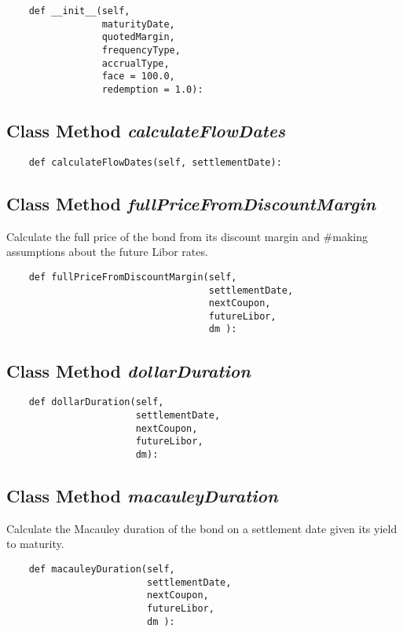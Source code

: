 \documentclass[twoside,11pt]{book}
\begin{document}
\begin{lstlisting}
    def __init__(self, 
                 maturityDate,
                 quotedMargin,
                 frequencyType, 
                 accrualType,
                 face = 100.0, 
                 redemption = 1.0):
\end{lstlisting}

\subsection{Class Method {\it calculateFlowDates}}


\begin{lstlisting}
    def calculateFlowDates(self, settlementDate):
\end{lstlisting}

\subsection{Class Method {\it fullPriceFromDiscountMargin}}
Calculate the full price of the bond from its discount margin and \#making assumptions about the future Libor rates. 

\begin{lstlisting}
    def fullPriceFromDiscountMargin(self, 
                                    settlementDate,
                                    nextCoupon,
                                    futureLibor,
                                    dm ):
\end{lstlisting}

\subsection{Class Method {\it dollarDuration}}


\begin{lstlisting}
    def dollarDuration(self, 
                       settlementDate, 
                       nextCoupon,
                       futureLibor,
                       dm):
\end{lstlisting}

\subsection{Class Method {\it macauleyDuration}}
Calculate the Macauley duration of the bond on a settlement date given its yield to maturity. 

\begin{lstlisting}
    def macauleyDuration(self,
                         settlementDate,
                         nextCoupon,
                         futureLibor,
                         dm ):
\end{lstlisting}
\end{document}

